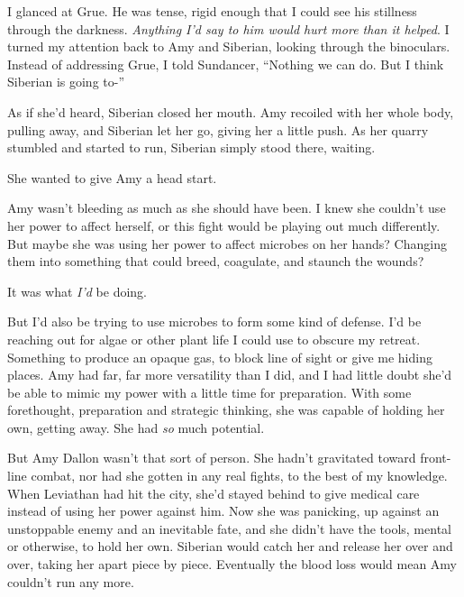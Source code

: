 I glanced at Grue.  He was tense, rigid enough that I could see his stillness through the darkness.  \emph{Anything I'd say to him would hurt more than it helped}.  I turned my attention back to Amy and Siberian, looking through the binoculars.  Instead of addressing Grue, I told Sundancer, ``Nothing we can do.  But I think Siberian is going to-''



As if she'd heard, Siberian closed her mouth.  Amy recoiled with her whole body, pulling away, and Siberian let her go, giving her a little push.  As her quarry stumbled and started to run, Siberian simply stood there, waiting.



She wanted to give Amy a head start.



Amy wasn't bleeding as much as she should have been.  I knew she couldn't use her power to affect herself, or this fight would be playing out much differently.  But maybe she was using her power to affect microbes on her hands?  Changing them into something that could breed, coagulate, and staunch the wounds?



It was what \emph{I'd} be doing.



But I'd also be trying to use microbes to form some kind of defense.  I'd be reaching out for algae or other plant life I could use to obscure my retreat.  Something to produce an opaque gas, to block line of sight or give me hiding places.  Amy had far, far more versatility than I did, and I had little doubt she'd be able to mimic my power with a little time for preparation.  With some forethought, preparation and strategic thinking, she was capable of holding her own, getting away.  She had \emph{so} much potential.



But Amy Dallon wasn't that sort of person.  She hadn't gravitated toward front-line combat, nor had she gotten in any real fights, to the best of my knowledge.  When Leviathan had hit the city, she'd stayed behind to give medical care instead of using her power against him.  Now she was panicking, up against an unstoppable enemy and an inevitable fate, and she didn't have the tools, mental or otherwise, to hold her own.  Siberian would catch her and release her over and over, taking her apart piece by piece.  Eventually the blood loss would mean Amy couldn't run any more.



